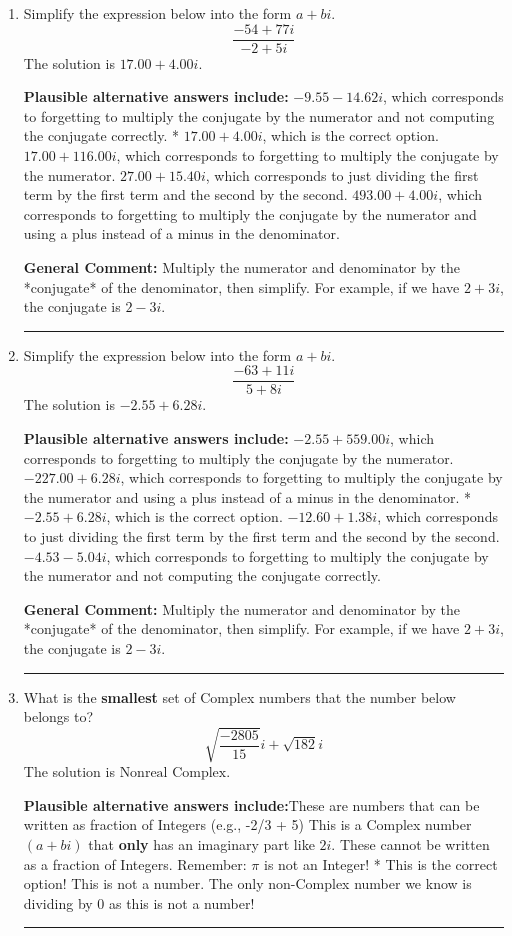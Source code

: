 \documentclass{extbook}[14pt]
\newcommand{\litem}[1]{\item #1

\rule{\textwidth}{0.4pt}}
\begin{document}
\begin{enumerate}\litem{
Simplify the expression below into the form $a+bi$.
\[ \frac{-54 + 77 i}{-2 + 5 i} \]The solution is \( 17.00  + 4.00 i \).\begin{enumerate}[label=\Alph*.]
\textbf{Plausible alternative answers include:} $-9.55  - 14.62 i$, which corresponds to forgetting to multiply the conjugate by the numerator and not computing the conjugate correctly.
* $17.00  + 4.00 i$, which is the correct option.
 $17.00  + 116.00 i$, which corresponds to forgetting to multiply the conjugate by the numerator.
 $27.00  + 15.40 i$, which corresponds to just dividing the first term by the first term and the second by the second.
 $493.00  + 4.00 i$, which corresponds to forgetting to multiply the conjugate by the numerator and using a plus instead of a minus in the denominator.
\end{enumerate}

\textbf{General Comment:} Multiply the numerator and denominator by the *conjugate* of the denominator, then simplify. For example, if we have $2+3i$, the conjugate is $2-3i$.
}
\litem{
Simplify the expression below into the form $a+bi$.
\[ \frac{-63 + 11 i}{5 + 8 i} \]The solution is \( -2.55  + 6.28 i \).\begin{enumerate}[label=\Alph*.]
\textbf{Plausible alternative answers include:} $-2.55  + 559.00 i$, which corresponds to forgetting to multiply the conjugate by the numerator.
 $-227.00  + 6.28 i$, which corresponds to forgetting to multiply the conjugate by the numerator and using a plus instead of a minus in the denominator.
* $-2.55  + 6.28 i$, which is the correct option.
 $-12.60  + 1.38 i$, which corresponds to just dividing the first term by the first term and the second by the second.
 $-4.53  - 5.04 i$, which corresponds to forgetting to multiply the conjugate by the numerator and not computing the conjugate correctly.
\end{enumerate}

\textbf{General Comment:} Multiply the numerator and denominator by the *conjugate* of the denominator, then simplify. For example, if we have $2+3i$, the conjugate is $2-3i$.
}
\litem{
What is the \textbf{smallest} set of Complex numbers that the number below belongs to?
\[ \sqrt{\frac{-2805}{15}} i+\sqrt{182}i \]The solution is \( \text{Nonreal Complex} \).\begin{enumerate}[label=\Alph*.]
\textbf{Plausible alternative answers include:}These are numbers that can be written as fraction of Integers (e.g., -2/3 + 5)
This is a Complex number $(a+bi)$ that \textbf{only} has an imaginary part like $2i$.
These cannot be written as a fraction of Integers. Remember: $\pi$ is not an Integer!
* This is the correct option!
This is not a number. The only non-Complex number we know is dividing by 0 as this is not a number!
\end{enumerate}

}
\end{enumerate}
\end{document}

